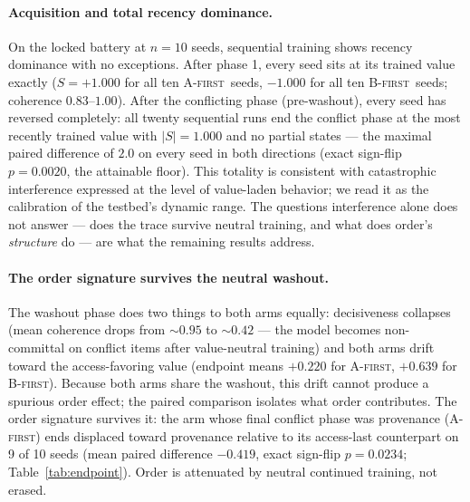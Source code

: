 \documentclass{article}
\newcommand{\afirst}{\textsc{A-first}\xspace}
\newcommand{\bfirst}{\textsc{B-first}\xspace}
\newcommand{\score}{$S$\xspace}
\begin{document}
\paragraph{Acquisition and total recency dominance.} On the locked battery at
$n{=}10$ seeds, sequential training shows recency dominance with no exceptions.
After phase 1, every seed sits at its trained value exactly (\score $= +1.000$ for
all ten \afirst\ seeds, $-1.000$ for all ten \bfirst\ seeds; coherence
$0.83$--$1.00$). After the conflicting phase (pre-washout), every seed has reversed
completely: all twenty sequential runs end the conflict phase at the most recently
trained value with $|S|{=}1.000$ and no partial states --- the maximal paired
difference of $2.0$ on every seed in both directions (exact sign-flip $p{=}0.0020$,
the attainable floor). This totality is consistent with catastrophic interference
\citep{mccloskey1989catastrophic} expressed at the level of value-laden behavior; we
read it as the calibration of the testbed's dynamic range. The questions interference
alone does not answer --- does the trace survive neutral training, and what does
order's \emph{structure} do --- are what the remaining results address.

\paragraph{The order signature survives the neutral washout.} The washout phase does
two things to both arms equally: decisiveness collapses (mean coherence drops from
${\sim}0.95$ to ${\sim}0.42$ --- the model becomes non-committal on conflict items
after value-neutral training) and both arms drift toward the access-favoring value
(endpoint means $+0.220$ for \afirst, $+0.639$ for \bfirst). Because both arms share
the washout, this drift cannot produce a spurious order effect; the paired comparison
isolates what order contributes. The order signature survives it: the arm whose final
conflict phase was provenance (\afirst) ends displaced toward provenance relative to
its access-last counterpart on 9 of 10 seeds (mean paired difference $-0.419$, exact
sign-flip $p{=}0.0234$; Table~\ref{tab:endpoint}). Order is attenuated by neutral
continued training, not erased.
\end{document}
